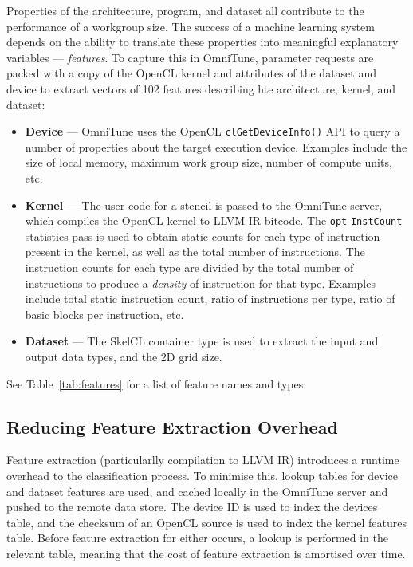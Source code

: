 Properties of the architecture, program, and dataset all contribute to
the performance of a workgroup size. The success of a machine learning
system depends on the ability to translate these properties into
meaningful explanatory variables --- \emph{features}. To capture this
in OmniTune, parameter requests are packed with a copy of the OpenCL
kernel and attributes of the dataset and device to extract vectors of
102 features describing hte architecture, kernel, and dataset:
%
\begin{itemize}
\item \textbf{Device} --- OmniTune uses the OpenCL
  \texttt{clGetDeviceInfo()} API to query a number of properties about
  the target execution device. Examples include the size of local
  memory, maximum work group size, number of compute units, etc.
\item \textbf{Kernel} --- The user code for a stencil is passed to the
  OmniTune server, which compiles the OpenCL kernel to LLVM IR
  bitcode. The \texttt{opt} \texttt{InstCount} statistics pass is used
  to obtain static counts for each type of instruction present in the
  kernel, as well as the total number of instructions. The instruction
  counts for each type are divided by the total number of instructions
  to produce a \emph{density} of instruction for that type. Examples
  include total static instruction count, ratio of instructions per
  type, ratio of basic blocks per instruction, etc.
\item \textbf{Dataset} --- The SkelCL container type is used to
  extract the input and output data types, and the 2D grid size.
\end{itemize}
%
See Table~\ref{tab:features} for a list of feature names and types.


\subsection{Reducing Feature Extraction Overhead}


Feature extraction (particularlly compilation to LLVM IR) introduces a
runtime overhead to the classification process. To minimise this,
lookup tables for device and dataset features are used, and cached
locally in the OmniTune server and pushed to the remote data
store. The device ID is used to index the devices table, and the
checksum of an OpenCL source is used to index the kernel features
table. Before feature extraction for either occurs, a lookup is
performed in the relevant table, meaning that the cost of feature
extraction is amortised over time.


